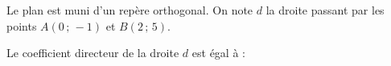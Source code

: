 
Le plan est muni d'un repère orthogonal. On note $d$ la droite passant par les points $A(0\,;\,-1)$ et $B(2\,;\,5)$.

Le coefficient directeur de la droite $d$ est égal à :

\smallskip

